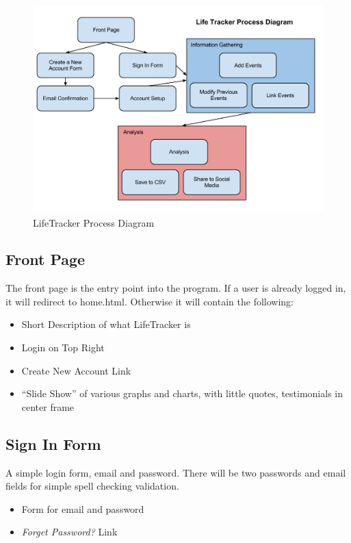 \documentclass[12pt]{article}
\begin{document}
\begin{figure}[h!]
  \centering
  \includegraphics[scale=.5]{images/procDiag}
  \caption{LifeTracker Process Diagram}
  \label{fig:procDiag}
\end{figure}

\subsection{Front Page}

The front page is the entry point into the program. If a user is already logged in, it will redirect to home.html. Otherwise it will contain the following:

\begin{itemize}
  \item Short Description of what LifeTracker is
  \item Login on Top Right
  \item Create New Account Link
  \item ``Slide Show'' of various graphs and charts, with little quotes, testimonials in center frame
\end{itemize}

\subsection{Sign In Form}

A simple login form, email and password. There will be two passwords and email fields for simple spell checking validation.

\begin{itemize}
  \item Form for email and password
  \item \textit{Forget Password?} Link
\end{itemize}
\end{document}
